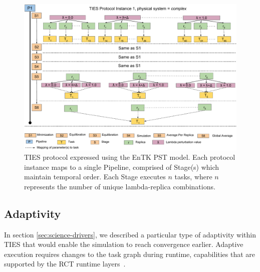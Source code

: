 
\begin{figure}
  \centering
   \includegraphics[width=\columnwidth]{figures/_TIES_EnTK_implementation.pdf}
  \caption{TIES protocol expressed using the EnTK PST model. Each protocol 
  instance maps to a single Pipeline, comprised of Stage(s) which maintain 
  temporal order. Each Stage executes $n$ tasks, where $n$ represents the 
  number of unique lambda-replica combinations.}
\label{fig:pst}
\end{figure}




\subsection{Adaptivity}

In section \ref{sec:science-drivers}, we described a particular type of
adaptivity within TIES that would enable the simulation to reach
convergence earlier. Adaptive execution requires changes to the task graph 
during runtime, capabilities that are supported by the RCT runtime 
layers~\cite{power-of-many17}.

